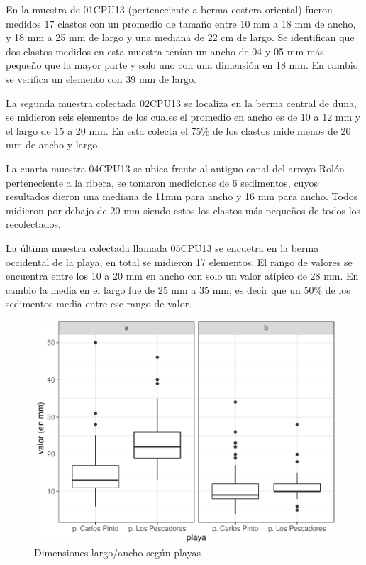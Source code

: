 \documentclass[11pt,]{article}
\begin{document}
En la muestra de 01CPU13 (perteneciente a berma costera oriental) fueron
medidos 17 clastos con un promedio de tamaño entre 10 mm a 18 mm de
ancho, y 18 mm a 25 mm de largo y una mediana de 22 cm de largo. Se
identifican que dos clastos medidos en esta muestra tenían un ancho de
04 y 05 mm más pequeño que la mayor parte y solo uno con una dimensión
en 18 mm. En cambio se verifica un elemento con 39 mm de largo.

La segunda muestra colectada 02CPU13 se localiza en la berma central de
duna, se midieron seis elementos de los cuales el promedio en ancho es
de 10 a 12 mm y el largo de 15 a 20 mm. En esta colecta el 75\% de los
clastos mide menos de 20 mm de ancho y largo.

La cuarta muestra 04CPU13 se ubica frente al antiguo canal del arroyo
Rolón perteneciente a la ribera, se tomaron mediciones de 6 sedimentos,
cuyos resultados dieron una mediana de 11mm para ancho y 16 mm para
ancho. Todos midieron por debajo de 20 mm siendo estos los clastos más
pequeños de todos los recolectados.

La última muestra colectada llamada 05CPU13 se encuetra en la berma
occidental de la playa, en total se midieron 17 elementos. El rango de
valores se encuentra entre los 10 a 20 mm en ancho con solo un valor
atípico de 28 mm. En cambio la media en el largo fue de 25 mm a 35 mm,
es decir que un 50\% de los sedimentos media entre ese rango de valor.

\begin{figure}[H]
\includegraphics{manuscrito_files/figure-latex/unnamed-chunk-2-1} \caption{\label{ab_por_playas}Dimensiones largo/ancho según playas}\label{fig:unnamed-chunk-2}
\end{figure}
\end{document}
